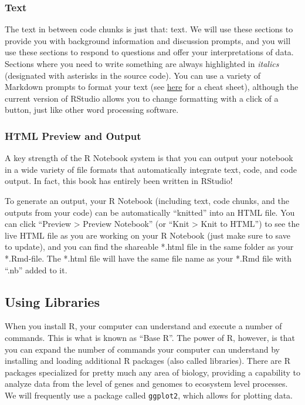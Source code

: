 \documentclass[
]{book}
\begin{document}
\hypertarget{text}{%
\subsubsection*{Text}\label{text}}

The text in between code chunks is just that: text. We will use these sections to provide you with background information and discussion prompts, and you will use these sections to respond to questions and offer your interpretations of data. Sections where you need to write something are always highlighted in \emph{italics} (designated with asterisks in the source code). You can use a variety of Markdown prompts to format your text (see \href{https://rstudio.com/wp-content/uploads/2015/02/rmarkdown-cheatsheet.pdf}{here} for a cheat sheet), although the current version of RStudio allows you to change formatting with a click of a button, just like other word processing software.

\hypertarget{html-preview-and-output}{%
\subsubsection*{HTML Preview and Output}\label{html-preview-and-output}}

A key strength of the R Notebook system is that you can output your notebook in a wide variety of file formats that automatically integrate text, code, and code output. In fact, this book has entirely been written in RStudio!

To generate an output, your R Notebook (including text, code chunks, and the outputs from your code) can be automatically ``knitted'' into an HTML file. You can click ``Preview \textgreater{} Preview Notebook'' (or ``Knit \textgreater{} Knit to HTML'') to see the live HTML file as you are working on your R Notebook (just make sure to save to update), and you can find the shareable *.html file in the same folder as your *.Rmd-file. The *.html file will have the same file name as your *.Rmd file with ``.nb'' added to it.

\hypertarget{libraries}{%
\subsection{Using Libraries}\label{libraries}}

When you install R, your computer can understand and execute a number of commands. This is what is known as ``Base R''. The power of R, however, is that you can expand the number of commands your computer can understand by installing and loading additional R packages (also called libraries). There are R packages specialized for pretty much any area of biology, providing a capability to analyze data from the level of genes and genomes to ecosystem level processes. We will frequently use a package called \texttt{ggplot2}, which allows for plotting data.
\end{document}
